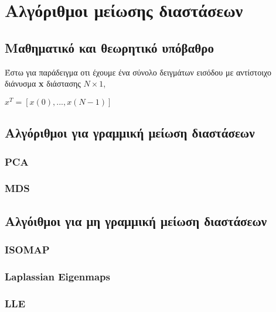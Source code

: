 
\chapter{Αλγόριθμοι μείωσης διαστάσεων}

\section{Μαθηματικό και θεωρητικό υπόβαθρο}
\par
Έστω για παράδειγμα οτι έχουμε ένα σύνολο δειγμάτων εισόδου με αντίστοιχο διάνυσμα \textlatin{\textbf{x}} διάστασης $N\times1$,

\begin{center}
$x^{T} = [x(0),...,x(N-1)]$
\end{center}

\section{Αλγόριθμοι για γραμμική μείωση διαστάσεων}
\subsection{\textlatin{PCA}}
\subsection{\textlatin{MDS}}

\section{Αλγόιθμοι για μη γραμμική μείωση διαστάσεων}
\subsection{\textlatin{ISOMAP}}
\subsection{\textlatin{Laplassian Eigenmaps}}
\subsection{\textlatin{LLE}}
